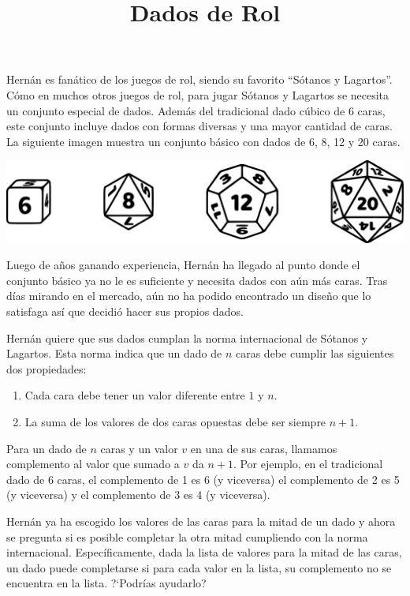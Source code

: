 \documentclass{oci}
\title{Dados de Rol}
\begin{document}
\begin{problemDescription}
  Hernán es fanático de los juegos de rol, siendo su favorito ``Sótanos y Lagartos''.
  Cómo en muchos otros juegos de rol, para jugar Sótanos y Lagartos se
  necesita un conjunto especial de dados.
  Además del tradicional dado cúbico de 6 caras, este conjunto incluye dados
  con formas diversas y una mayor cantidad de caras.
  La siguiente imagen muestra un conjunto básico con
  dados de 6, 8, 12 y 20 caras.
  \begin{center}
    \includegraphics[scale=0.2]{horizontal-sin4}
  \end{center}

  Luego de años ganando experiencia, Hernán ha llegado al
  punto donde el conjunto básico ya no le es suficiente
  y necesita dados con aún más caras.
  Tras días mirando en el mercado, aún no ha podido encontrado
  un diseño que lo satisfaga así que decidió hacer sus propios
  dados.

  Hernán quiere que sus dados cumplan la norma internacional
  de Sótanos y Lagartos.
  Esta norma indica que un dado de $n$ caras debe cumplir las
  siguientes dos propiedades:
  \begin{enumerate}
    \item Cada cara debe tener un valor diferente entre $1$ y $n$.
    \item La suma de los valores de dos caras opuestas debe ser siempre $n+1$.
  \end{enumerate}
  Para un dado de $n$ caras y un valor $v$ en una de sus caras, llamamos
  complemento al valor que sumado a $v$ da $n+1$.
  Por ejemplo, en el tradicional dado de 6 caras, el complemento de 1 es 6 (y viceversa)
  el complemento de 2 es 5 (y viceversa) y el complemento de 3 es 4 (y viceversa).

  Hernán ya ha escogido los valores de las caras para la mitad de un dado y
  ahora se pregunta si es posible completar la otra mitad cumpliendo con la norma
  internacional.
  Específicamente, dada la lista de valores para la mitad de las caras, un
  dado puede completarse si para cada valor en la lista, su complemento no se
  encuentra en la lista.
  ?`Podrías ayudarlo?
\end{problemDescription}
\end{document}
